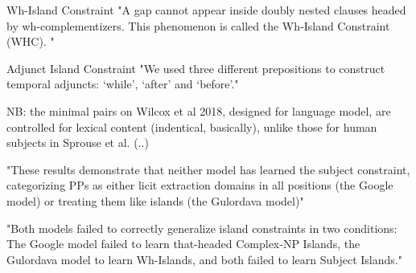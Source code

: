 Wh-Island Constraint
"A gap cannot appear inside doubly nested clauses headed by wh-complementizers. This phenomenon is called the Wh-Island Constraint (WHC). "  \citep{wilcox2018rnn}

Adjunct Island Constraint
"We used three different prepositions to construct temporal adjuncts: ‘while’, ‘after’ and ‘before’." \citep{wilcox2018rnn}

NB: the minimal pairs on Wilcox et al 2018, designed for  language model, are controlled for lexical content (indentical, basically), unlike those for human subjects in Sprouse et al. (..)

"These results demonstrate
that neither model has learned the subject constraint, categorizing PPs as either licit extraction
domains in all positions (the Google model) or
treating them like islands (the Gulordava model)"  \citep{wilcox2018rnn}

"Both models failed to correctly generalize island constraints in two conditions: The Google model failed to learn that-headed Complex-NP Islands, the Gulordava model to learn Wh-Islands, and both failed to learn Subject Islands."\citep{wilcox2018rnn}






